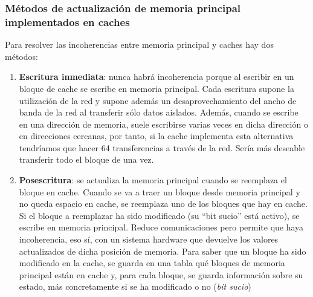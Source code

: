 \documentclass[10pt,a4paper,spanish]{report}
\begin{document}
\textcolor[rgb]{0.2,0.4,0.8}{\subsubsection{Métodos de actualización de memoria principal implementados en caches}}
Para resolver las incoherencias entre memoria principal y caches hay dos métodos:
\begin{enumerate}[\color{azul}{\bf $\heartsuit$}]
    \item \textbf{\textcolor[rgb]{0.2,0.4,0.8}{Escritura inmediata}}: nunca habrá incoherencia porque al escribir en un bloque de cache se escribe en memoria principal. Cada escritura supone la utilización de la red y supone además un desaprovechamiento del ancho de banda de la red al transferir sólo datos aislados. Además, cuando se escribe en una dirección de memoria, suele escribirse varias veces en dicha dirección o en direcciones cercanas, por tanto, si la cache implementa esta alternativa tendríamos que hacer 64 transferencias a través de la red. Sería más deseable transferir todo el bloque de una vez.

    \item \textbf{\textcolor[rgb]{0.2,0.4,0.8}{Posescritura}}: se actualiza la memoria principal cuando se reemplaza el bloque en cache. Cuando se va a traer un bloque desde memoria principal y no queda espacio en cache, se reemplaza uno de los bloques que hay en cache. Si el bloque a reemplazar ha sido modificado (su ``bit sucio'' está activo), se escribe en memoria principal. Reduce comunicaciones pero permite que haya incoherencia, eso sí, con un sistema hardware que devuelve los valores actualizados de dicha posición de memoria. Para saber que un bloque ha sido modificado en la cache, se guarda en una tabla qué bloques de memoria principal están en cache y, para cada bloque, se guarda información sobre su estado, más concretamente si se ha modificado o no (\textcolor[rgb]{0.2,0.4,0.8}{\textit{bit sucio}})
\end{enumerate}
\end{document}
